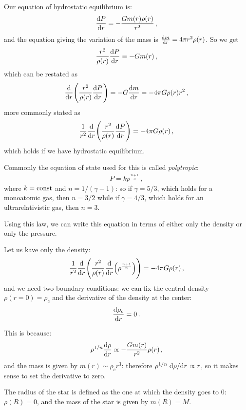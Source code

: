 \documentclass[main.tex]{subfiles}
\begin{document}
Our equation of hydrostatic equilibrium is:
%
\begin{align}
  \dv{P}{r} = - \frac{G m(r) \rho (r)}{r^2}
\,,
\end{align}
%
and the equation giving the variation of the mass is \(\dv{m}{r} = 4 \pi r^2 \rho (r)\).
So we get 
%
\begin{align}
  \frac{r^2}{\rho (r)} \dv{P}{r} = - G m(r)
\,,
\end{align}
%
which can be restated as 
%
\begin{align}
  \dv{}{r} \qty(\frac{r^2}{\rho (r)} \dv{P}{r}) = - G \dv{m}{r} = - 4 \pi G \rho (r) r^2
\,,
\end{align}
%
more commonly stated as 
%
\begin{align}
  \frac{1}{r^2} \dv{}{r} \qty(\frac{r^2}{\rho (r)} \dv{P}{r}) = -4 \pi G \rho (r)
\,,
\end{align}
%
which holds if we have hydrostatic equilibrium. 

Commonly the equation of state used for this is called \emph{polytropic}: 
%
\begin{align}
  P = k \rho^{\frac{n+1}{n}}
\,,
\end{align}
%
where \(k = \text{const}\) and \(n = 1/ (\gamma -1)\): so if \(\gamma = 5/3\), which holds for a monoatomic gas, then \(n = 3/2\) while if \(\gamma = 4/3\), which holds for an ultrarelativistic gas, then \(n = 3\). 

Using this law, we can write this equation in terms of either only the density or only the pressure. 

Let us kave only the density: 
%
\begin{align}
  \frac{1}{r^2} \dv{}{r} \qty(\frac{r^2}{\rho (r)} \dv{}{r} \qty(\rho^{\frac{n+1}{n}})) = - 4 \pi G \rho (r)
\,,
\end{align}
%
and we need two boundary conditions: we can fix the central density \(\rho(r=0) = \rho_c\) and the derivative of the density at the center: 
%
\begin{align}
  \dv{\rho_c}{r} (r=0) = 0
\,.
\end{align}

This is because: 
%
\begin{align}
  \rho^{1/n} \dv{\rho }{r} \propto - \frac{Gm(r)}{r^2} \rho (r)
\,,
\end{align}
%
and the mass is given by \(m(r) \sim \rho_c r^3\): therefore \(\rho^{1/n} \dv*{\rho }{r} \propto r\), so it makes sense to set the derivative to zero. 

The radius of the star is defined as the one at which the density goes to 0: \(\rho (R) =0\), and the mass of the star is given by \(m(R) = M\). 
\end{document}
